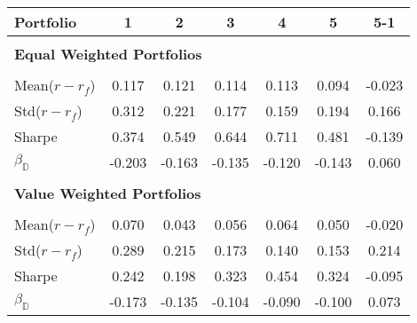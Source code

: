 \begin{tabular}{lcccccc}
\toprule 
 Portfolio & 1 & 2 & 3 & 4 & 5 & 5-1 \\ 
\hline \\[-1.8ex] 
\multicolumn{7}{l}{\textbf{Equal Weighted Portfolios}} \\ 
\hline \\[-1.8ex] 
Mean($r - r_f$) & 0.117 & 0.121 & 0.114  & 0.113  & 0.094 & -0.023 \\ 
Std($r - r_f$) & 0.312 & 0.221 & 0.177  & 0.159  & 0.194 & 0.166 \\ 
Sharpe & 0.374 & 0.549 & 0.644  & 0.711  & 0.481 & -0.139 \\ 
$\beta_\mathbb{D}$ & -0.203 & -0.163 & -0.135  & -0.120  & -0.143 & 0.060 \\ 
\hline \\[-1.8ex] 
\multicolumn{7}{l}{\textbf{Value Weighted Portfolios}} \\ 
\hline \\[-1.8ex] 
Mean($r - r_f$) & 0.070 & 0.043 & 0.056  & 0.064  & 0.050 & -0.020 \\ 
Std($r - r_f$) & 0.289 & 0.215 & 0.173  & 0.140  & 0.153 & 0.214 \\ 
Sharpe & 0.242 & 0.198 & 0.323  & 0.454  & 0.324 & -0.095 \\ 
$\beta_\mathbb{D}$ & -0.173 & -0.135 & -0.104  & -0.090  & -0.100 & 0.073 \\ 
\bottomrule 
\end{tabular}